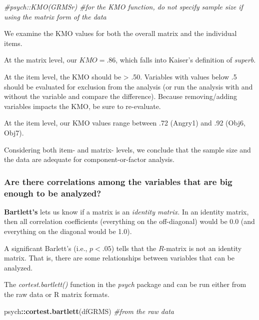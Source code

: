 \documentclass[
  english,
]{book}
\newenvironment{Shaded}{\begin{snugshade}}{\end{snugshade}}
\newcommand{\CommentTok}[1]{\textcolor[rgb]{0.56,0.35,0.01}{\textit{#1}}}
\newcommand{\KeywordTok}[1]{\textcolor[rgb]{0.13,0.29,0.53}{\textbf{#1}}}
\newcommand{\NormalTok}[1]{#1}
\newcommand{\OperatorTok}[1]{\textcolor[rgb]{0.81,0.36,0.00}{\textbf{#1}}}
\begin{document}
\begin{Shaded}
\begin{Highlighting}[]
\CommentTok{#psych::KMO(GRMSr) #for the KMO function, do not specify sample size if using the matrix form of the data}
\end{Highlighting}
\end{Shaded}

We examine the KMO values for both the overall matrix and the individual items.

At the matrix level, our \(KMO = .86\), which falls into Kaiser's definition of \emph{superb}.

At the item level, the KMO should be \textgreater{} .50. Variables with values below .5 should be evaluated for exclusion from the analysis (or run the analysis with and without the variable and compare the difference). Because removing/adding variables impacts the KMO, be sure to re-evaluate.

At the item level, our KMO values range between .72 (Angry1) and .92 (Obj6, Obj7).

Considering both item- and matrix- levels, we conclude that the sample size and the data are adequate for component-or-factor analysis.

\hypertarget{are-there-correlations-among-the-variables-that-are-big-enough-to-be-analyzed}{%
\subsubsection{Are there correlations among the variables that are big enough to be analyzed?}\label{are-there-correlations-among-the-variables-that-are-big-enough-to-be-analyzed}}

\textbf{Bartlett's} lets us know if a matrix is an \emph{identity matrix.} In an identity matrix, then all correlation coefficients (everything on the off-diagonal) would be 0.0 (and everything on the diagonal would be 1.0).

A significant Barlett's (i.e., \(p < .05\)) tells that the \(R\)-matrix is not an identity matrix. That is, there are some relationships between variables that can be analyzed.

The \emph{cortest.bartlett()} function in the \emph{psych} package and can be run either from the raw data or R matrix formats.

\begin{Shaded}
\begin{Highlighting}[]
\NormalTok{psych}\OperatorTok{::}\KeywordTok{cortest.bartlett}\NormalTok{(dfGRMS) }\CommentTok{#from the raw data}
\end{Highlighting}
\end{Shaded}
\end{document}
